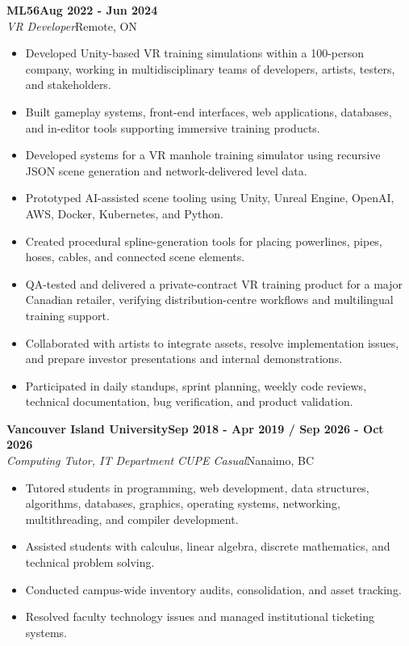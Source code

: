 \documentclass[10pt]{article}
\newcommand{\job}[4]{%
	\textbf{#1}\hfill\textbf{#4}\\
	\textit{#2}\hfill#3%
	\vspace{0pt}
}
\newcommand{\jobspace}{\vspace{6pt}}
\begin{document}
\job{ML56}{VR Developer}{Remote, ON}{Aug 2022 - Jun 2024}
\begin{itemize}[nosep]
	\item Developed Unity-based VR training simulations within a 100-person company, working in multidisciplinary teams of developers, artists, testers, and stakeholders.
	\item Built gameplay systems, front-end interfaces, web applications, databases, and in-editor tools supporting immersive training products.
	\item Developed systems for a VR manhole training simulator using recursive JSON scene generation and network-delivered level data.
	\item Prototyped AI-assisted scene tooling using Unity, Unreal Engine, OpenAI, AWS, Docker, Kubernetes, and Python.
	\item Created procedural spline-generation tools for placing powerlines, pipes, hoses, cables, and connected scene elements.
	\item QA-tested and delivered a private-contract VR training product for a major Canadian retailer, verifying distribution-centre workflows and multilingual training support.
	\item Collaborated with artists to integrate assets, resolve implementation issues, and prepare investor presentations and internal demonstrations.
	\item Participated in daily standups, sprint planning, weekly code reviews, technical documentation, bug verification, and product validation.
\end{itemize}
\jobspace

\job{Vancouver Island University}{Computing Tutor, IT Department CUPE Casual}{Nanaimo, BC}{Sep 2018 - Apr 2019 / Sep 2026 - Oct 2026}
\begin{itemize}[nosep]
	\item Tutored students in programming, web development, data structures, algorithms, databases, graphics, operating systems, networking, multithreading, and compiler development.
	\item Assisted students with calculus, linear algebra, discrete mathematics, and technical problem solving.
	\item Conducted campus-wide inventory audits, consolidation, and asset tracking.
	\item Resolved faculty technology issues and managed institutional ticketing systems.
\end{itemize}
\jobspace
\end{document}
